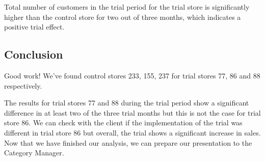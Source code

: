 \documentclass[]{article}
\begin{document}
Total number of customers in the trial period for the trial store is
significantly higher than the control store for two out of three months,
which indicates a positive trial effect.

\hypertarget{conclusion}{%
\subsection{Conclusion}\label{conclusion}}

Good work! We've found control stores 233, 155, 237 for trial stores 77,
86 and 88 respectively.

The results for trial stores 77 and 88 during the trial period show a
significant difference in at least two of the three trial months but
this is not the case for trial store 86. We can check with the client if
the implementation of the trial was different in trial store 86 but
overall, the trial shows a significant increase in sales. Now that we
have finished our analysis, we can prepare our presentation to the
Category Manager.
\end{document}
